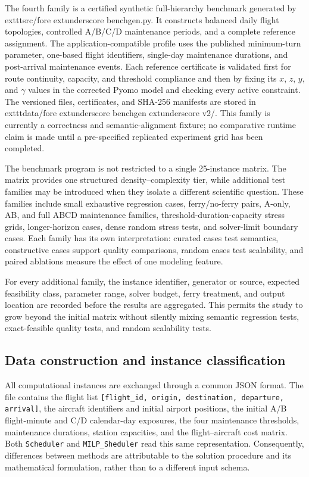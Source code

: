 The fourth family is a certified synthetic full-hierarchy benchmark generated
by 	exttt{src/fore	extunderscore benchgen.py}. It constructs balanced daily
flight topologies, controlled A/B/C/D maintenance periods, and a complete
reference assignment. The application-compatible profile uses the published
minimum-turn parameter, one-based flight identifiers, single-day maintenance
durations, and post-arrival maintenance events. Each reference certificate is
validated first for route continuity, capacity, and threshold compliance and
then by fixing its $x$, $z$, $y$, and $\gamma$ values in the corrected Pyomo
model and checking every active constraint. The versioned files, certificates,
and SHA-256 manifests are stored in 	exttt{data/fore	extunderscore benchgen	extunderscore v2/}.
This family is currently a correctness and semantic-alignment fixture; no
comparative runtime claim is made until a pre-specified replicated experiment
grid has been completed.

The benchmark program is not restricted to a single 25-instance matrix. The
matrix provides one structured density--complexity tier, while additional test
families may be introduced when they isolate a different scientific question.
These families include small exhaustive regression cases, ferry/no-ferry pairs,
A-only, AB, and full ABCD maintenance families, threshold-duration-capacity
stress grids, longer-horizon cases, dense random stress tests, and solver-limit
boundary cases. Each family has its own interpretation: curated cases test
semantics, constructive cases support quality comparisons, random cases test
scalability, and paired ablations measure the effect of one modeling feature.

For every additional family, the instance identifier, generator or source,
expected feasibility class, parameter range, solver budget, ferry treatment, and
output location are recorded before the results are aggregated. This permits
the study to grow beyond the initial matrix without silently mixing semantic
regression tests, exact-feasible quality tests, and random scalability tests.

\subsection{Data construction and instance classification}
\label{subsec:computational_data_classification}

All computational instances are exchanged through a common JSON format. The
file contains the flight list
\texttt{[flight\_id, origin, destination, departure, arrival]}, the aircraft
identifiers and initial airport positions, the initial A/B flight-minute and
C/D calendar-day exposures, the four maintenance thresholds, maintenance
durations, station capacities, and the flight--aircraft cost matrix. Both
\texttt{Scheduler} and \texttt{MILP\_Sheduler} read this same representation.
Consequently, differences between methods are attributable to the solution
procedure and its mathematical formulation, rather than to a different input
schema.

